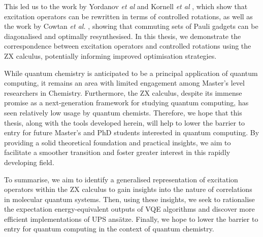 This led us to the work by Yordanov \textit{et al} \cite{Yordanov2020} and Kornell \textit{et al} \cite{Kornell2023}, which show that excitation operators can be rewritten in terms of controlled rotations, as well as the work by Cowtan \textit{et al.} \cite{Cowtan2020}, showing that commuting sets of Pauli gadgets can be diagonalised and optimally resynthesised. In this thesis, we demonstrate the correspondence between excitation operators and controlled rotations using the ZX calculus, potentially informing improved optimisation strategies.

While quantum chemistry is anticipated to be a principal application of quantum computing, it remains an area with limited engagement among Master's level researchers in Chemistry. Furthermore, the ZX calculus, despite its immense promise as a next-generation framework for studying quantum computing, has seen relatively low usage by quantum chemists. Therefore, we hope that this thesis, along with the tools developed herein, will help to lower the barrier to entry for future Master's and PhD students interested in quantum computing. By providing a solid theoretical foundation and practical insights, we aim to facilitate a smoother transition and foster greater interest in this rapidly developing field.

To summarise, we aim to identify a generalised representation of excitation operators within the ZX calculus to gain insights into the nature of correlations in molecular quantum systems. Then, using these insights, we seek to rationalise the expectation energy-equivalent outputs of VQE algorithms and discover more efficient implementations of UPS ansätze. Finally, we hope to lower the barrier to entry for quantum computing in the context of quantum chemistry.
